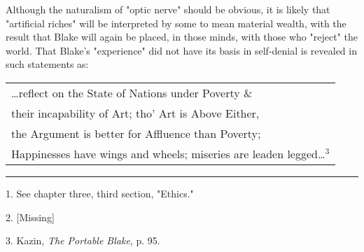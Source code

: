 \hspace*{5mm}Although the naturalism of "optic nerve" should be obvious, it is likely that "artificial riches"
will be interpreted by some to mean material wealth, with the result that Blake
will again be placed, in those minds, with those who "reject" the world.
That Blake's "experience" did not have its basis in self-denial is revealed in such statements as:\par
\vspace*{0.5\baselineskip}
\begin{center}
	\parbox{0.8\textwidth}{
		\centering
		\begin{tabular}{l}
			\dots reflect on the State of Nations under Poverty \& \\
			their incapability of Art; tho' Art is Above Either,   \\
			the Argument is better for Affluence than Poverty;     \\
			Happinesses have wings and wheels; miseries are leaden legged\dots$^{3}$
		\end{tabular}
	}%
\end{center}
\vspace*{\fill}
\noindent\rule{0.25\textwidth}{0.4pt}\par
1. See chapter three, third section, "Ethics."\par
2. [Missing]\par
3. Kazin, \textit{The Portable Blake}, p. 95.\par

\newpage

